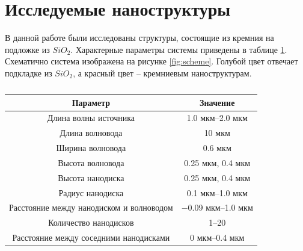 \section{Исследуемые наноструктуры}

В данной работе были исследованы структуры, состоящие из кремния на подложке из $SiO_2$. Характерные параметры системы приведены в таблице \ref{tbl:params}. Схематично система изображена на рисунке \ref{fig:scheme}. Голубой цвет отвечает подкладке из $SiO_2$, а красный цвет -- кремниевым наноструктурам.

\begin{table}[H]
	\centering
	\begin{tabular}{|c|c|}
		\hline
		Параметр & Значение\\
		\hline
		\hline
		Длина волны источника & 1.0 мкм--2.0 мкм \\
		\hline
		Длина волновода & 10 мкм \\
		\hline
		Ширина волновода & 0.6 мкм \\
		\hline
		Высота волновода & 0.25 мкм, 0.4 мкм \\
		\hline
		Высота нанодиска & 0.25 мкм, 0.4 мкм \\
		\hline
		Радиус нанодиска & 0.1 мкм--1.0 мкм\\
		\hline
		Расстояние между нанодиском и волноводом & $-$0.09 мкм--1.0 мкм\\
		\hline
		Количество нанодисков & 1--20 \\
		\hline
		Расстояние между соседними нанодисками & 0 мкм--0.4 мкм \\
		\hline
	\end{tabular}
	\caption{}
	\label{tbl:params}
\end{table}

